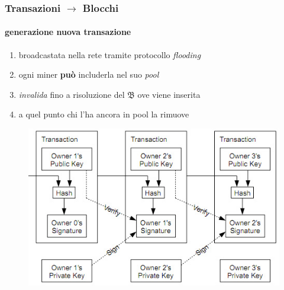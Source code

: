 \begin{frame}
	\frametitle{Transazioni $\rightarrow$ Blocchi} 
	\framesubtitle{generazione nuova transazione}
	
	\begin{enumerate}
		\item broadcastata nella rete tramite protocollo \textit{flooding}
		\item ogni miner \textbf{può} includerla nel suo \textit{pool}
		\item \textit{invalida} fino a risoluzione del $\mathfrak{B}$ ove viene inserita
		\item a quel punto chi l'ha ancora in pool la rimuove
	\end{enumerate}

	\begin{figure}[H]
		\begin{center}
			\includegraphics[height = 4.5 cm]{images/chain_transactions.png}	
		\end{center}
	\end{figure}
\end{frame}